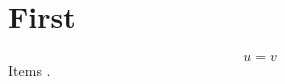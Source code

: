 \documentclass{article}
\begin{document}
\section{First}\label{sec:a}
\begin{equation}\label{eq:b} u = v \end{equation}
Items .
\end{document}
